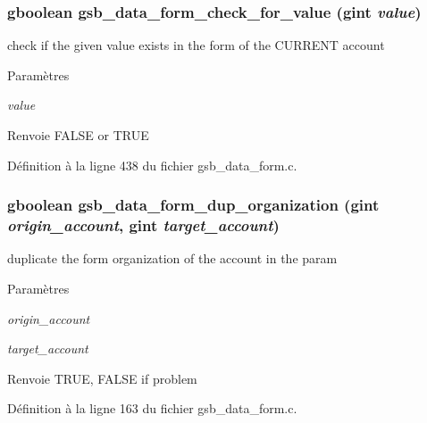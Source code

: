 \subsubsection[{gsb\_\-data\_\-form\_\-check\_\-for\_\-value}]{\setlength{\rightskip}{0pt plus 5cm}gboolean gsb\_\-data\_\-form\_\-check\_\-for\_\-value (gint {\em value})}\label{gsb__data__form_8c_ae6975b58c5f9085518baa3e97830514b}
check if the given value exists in the form of the CURRENT account


\begin{DoxyParams}{Paramètres}
\item[{\em value}]\end{DoxyParams}
\begin{DoxyReturn}{Renvoie}
FALSE or TRUE 
\end{DoxyReturn}


Définition à la ligne 438 du fichier gsb\_\-data\_\-form.c.

\subsubsection[{gsb\_\-data\_\-form\_\-dup\_\-organization}]{\setlength{\rightskip}{0pt plus 5cm}gboolean gsb\_\-data\_\-form\_\-dup\_\-organization (gint {\em origin\_\-account}, \/  gint {\em target\_\-account})}\label{gsb__data__form_8c_a838ada33bfce85d6324f0ea409216103}
duplicate the form organization of the account in the param


\begin{DoxyParams}{Paramètres}
\item[{\em origin\_\-account}]\item[{\em target\_\-account}]\end{DoxyParams}
\begin{DoxyReturn}{Renvoie}
TRUE, FALSE if problem 
\end{DoxyReturn}


Définition à la ligne 163 du fichier gsb\_\-data\_\-form.c.

